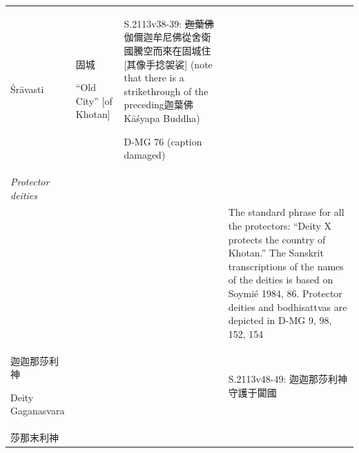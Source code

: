 \documentclass[
  english,
  a4paper,
  DIV=12,
  footlines=2.1,
  usegeometry=true]{scrartcl}
\begin{document}
\begin{longtable}[]{@{}llll@{}}
\begin{minipage}[t]{0.13\columnwidth}
Śrāvasti\strut
\end{minipage} & \begin{minipage}[t]{0.13\columnwidth}\raggedright
固城

``Old City'' {[}of Khotan{]}\strut
\end{minipage} & \begin{minipage}[t]{0.44\columnwidth}\raggedright
S.2113v38-39: \sout{迦葉佛}
伽儞迦牟尼佛從舍衛國騰空而來在固城住{[}其像手捻袈裟{]} (note that there
is a strikethrough of the preceding迦葉佛Kāśyapa Buddha)

D-MG 76 (caption damaged)\strut
\end{minipage}\tabularnewline
\begin{minipage}[t]{0.18\columnwidth}\raggedright
\emph{Protector deities}\strut
\end{minipage} & \begin{minipage}[t]{0.13\columnwidth}\raggedright
\strut
\end{minipage} & \begin{minipage}[t]{0.13\columnwidth}\raggedright
\strut
\end{minipage} & \begin{minipage}[t]{0.44\columnwidth}\raggedright
\strut
\end{minipage}\tabularnewline
\begin{minipage}[t]{0.18\columnwidth}\raggedright
\strut
\end{minipage} & \begin{minipage}[t]{0.13\columnwidth}\raggedright
\strut
\end{minipage} & \begin{minipage}[t]{0.13\columnwidth}\raggedright
\strut
\end{minipage} & \begin{minipage}[t]{0.44\columnwidth}\raggedright
The standard phrase for all the protectors: ``Deity X protects the
country of Khotan.'' The Sanskrit transcriptions of the names of the
deities is based on Soymié 1984, 86. Protector deities and bodhisattvas
are depicted in D-MG 9, 98, 152, 154\strut
\end{minipage}\tabularnewline
\begin{minipage}[t]{0.18\columnwidth}\raggedright
迦迦那莎利神

Deity Gaganasvara\strut
\end{minipage} & \begin{minipage}[t]{0.13\columnwidth}\raggedright
\strut
\end{minipage} & \begin{minipage}[t]{0.13\columnwidth}\raggedright
\strut
\end{minipage} & \begin{minipage}[t]{0.44\columnwidth}\raggedright
S.2113v48-49: 迦迦那莎利神守護于闐國\strut
\end{minipage}\tabularnewline
\begin{minipage}[t]{0.18\columnwidth}\raggedright
莎那末利神


\end{minipage}
\end{longtable}
\end{document}
